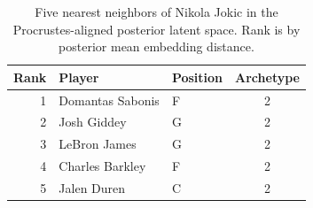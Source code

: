 \begin{table}[htbp]
  \centering\small
  \begin{tabular}{rllc}
    \toprule
    Rank & Player & Position & Archetype \\
    \midrule
    1 & Domantas Sabonis & F & 2 \\
    2 & Josh Giddey & G & 2 \\
    3 & LeBron James & G & 2 \\
    4 & Charles Barkley & F & 2 \\
    5 & Jalen Duren & C & 2 \\
    \bottomrule
  \end{tabular}
  \caption{Five nearest neighbors of Nikola Jokic in the Procrustes-aligned posterior latent space. Rank is by posterior mean embedding distance.}
  \label{tab:Nikola_Jokic_neighbors}
\end{table}


